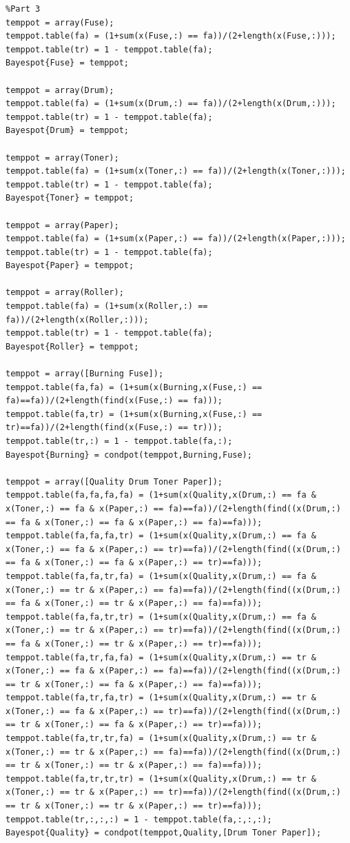 \documentclass[11pt,a4paper,oneside]{report}
\begin{document}
\begin{lstlisting}
%Part 3
temppot = array(Fuse);
temppot.table(fa) = (1+sum(x(Fuse,:) == fa))/(2+length(x(Fuse,:)));
temppot.table(tr) = 1 - temppot.table(fa);
Bayespot{Fuse} = temppot;

temppot = array(Drum);
temppot.table(fa) = (1+sum(x(Drum,:) == fa))/(2+length(x(Drum,:)));
temppot.table(tr) = 1 - temppot.table(fa);
Bayespot{Drum} = temppot;

temppot = array(Toner);
temppot.table(fa) = (1+sum(x(Toner,:) == fa))/(2+length(x(Toner,:)));
temppot.table(tr) = 1 - temppot.table(fa);
Bayespot{Toner} = temppot;

temppot = array(Paper);
temppot.table(fa) = (1+sum(x(Paper,:) == fa))/(2+length(x(Paper,:)));
temppot.table(tr) = 1 - temppot.table(fa);
Bayespot{Paper} = temppot;

temppot = array(Roller);
temppot.table(fa) = (1+sum(x(Roller,:) == fa))/(2+length(x(Roller,:)));
temppot.table(tr) = 1 - temppot.table(fa);
Bayespot{Roller} = temppot;

temppot = array([Burning Fuse]);
temppot.table(fa,fa) = (1+sum(x(Burning,x(Fuse,:) == fa)==fa))/(2+length(find(x(Fuse,:) == fa)));
temppot.table(fa,tr) = (1+sum(x(Burning,x(Fuse,:) == tr)==fa))/(2+length(find(x(Fuse,:) == tr)));
temppot.table(tr,:) = 1 - temppot.table(fa,:);
Bayespot{Burning} = condpot(temppot,Burning,Fuse);

temppot = array([Quality Drum Toner Paper]);
temppot.table(fa,fa,fa,fa) = (1+sum(x(Quality,x(Drum,:) == fa & x(Toner,:) == fa & x(Paper,:) == fa)==fa))/(2+length(find((x(Drum,:) == fa & x(Toner,:) == fa & x(Paper,:) == fa)==fa)));
temppot.table(fa,fa,fa,tr) = (1+sum(x(Quality,x(Drum,:) == fa & x(Toner,:) == fa & x(Paper,:) == tr)==fa))/(2+length(find((x(Drum,:) == fa & x(Toner,:) == fa & x(Paper,:) == tr)==fa)));
temppot.table(fa,fa,tr,fa) = (1+sum(x(Quality,x(Drum,:) == fa & x(Toner,:) == tr & x(Paper,:) == fa)==fa))/(2+length(find((x(Drum,:) == fa & x(Toner,:) == tr & x(Paper,:) == fa)==fa)));
temppot.table(fa,fa,tr,tr) = (1+sum(x(Quality,x(Drum,:) == fa & x(Toner,:) == tr & x(Paper,:) == tr)==fa))/(2+length(find((x(Drum,:) == fa & x(Toner,:) == tr & x(Paper,:) == tr)==fa)));
temppot.table(fa,tr,fa,fa) = (1+sum(x(Quality,x(Drum,:) == tr & x(Toner,:) == fa & x(Paper,:) == fa)==fa))/(2+length(find((x(Drum,:) == tr & x(Toner,:) == fa & x(Paper,:) == fa)==fa)));
temppot.table(fa,tr,fa,tr) = (1+sum(x(Quality,x(Drum,:) == tr & x(Toner,:) == fa & x(Paper,:) == tr)==fa))/(2+length(find((x(Drum,:) == tr & x(Toner,:) == fa & x(Paper,:) == tr)==fa)));
temppot.table(fa,tr,tr,fa) = (1+sum(x(Quality,x(Drum,:) == tr & x(Toner,:) == tr & x(Paper,:) == fa)==fa))/(2+length(find((x(Drum,:) == tr & x(Toner,:) == tr & x(Paper,:) == fa)==fa)));
temppot.table(fa,tr,tr,tr) = (1+sum(x(Quality,x(Drum,:) == tr & x(Toner,:) == tr & x(Paper,:) == tr)==fa))/(2+length(find((x(Drum,:) == tr & x(Toner,:) == tr & x(Paper,:) == tr)==fa)));
temppot.table(tr,:,:,:) = 1 - temppot.table(fa,:,:,:);
Bayespot{Quality} = condpot(temppot,Quality,[Drum Toner Paper]);


\end{lstlisting}
\end{document}
